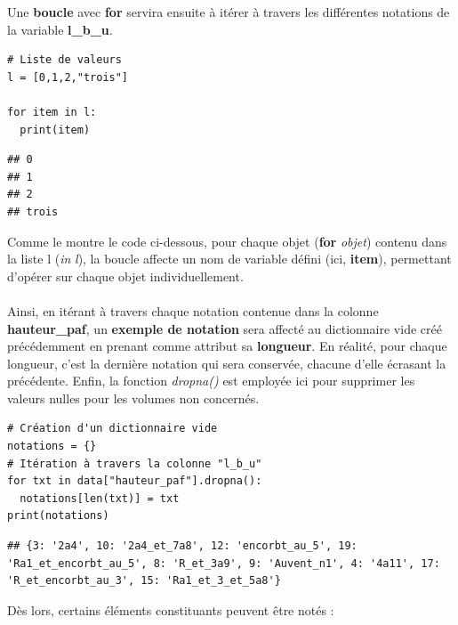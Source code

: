 \documentclass[
  11pt,
  french,
]{article}
\begin{document}
Une \textbf{boucle} avec \textbf{for} servira ensuite à itérer à travers
les différentes notations de la variable \textbf{l\_b\_u}.

\begin{tcolorbox}[title= Exemple de boucle en for ,colback=boitecode]
\begin{lstlisting}[style=code]
# Liste de valeurs
l = [0,1,2,"trois"]

for item in l:
  print(item)\end{lstlisting}
\begin{lstlisting}[style=out]
## 0
## 1
## 2
## trois
\end{lstlisting}
\end{tcolorbox}

Comme le montre le code ci-dessous, pour chaque objet (\textbf{for}
\emph{objet}) contenu dans la liste l (\emph{in} \emph{l}), la boucle
affecte un nom de variable défini (ici, \textbf{item}), permettant
d'opérer sur chaque objet individuellement.\\
~\\

Ainsi, en itérant à travers chaque notation contenue dans la colonne
\textbf{hauteur\_paf}, un \textbf{exemple de notation} sera affecté au
dictionnaire vide créé précédemment en prenant comme attribut sa
\textbf{longueur}. En réalité, pour chaque longueur, c'est la dernière
notation qui sera conservée, chacune d'elle écrasant la précédente.
Enfin, la fonction \emph{dropna()} est employée ici pour supprimer les
valeurs nulles pour les volumes non concernés.

\begin{tcolorbox}[title= Énumération des différentes notations ,colback=boitecode]
\begin{lstlisting}[style=code]
# Création d'un dictionnaire vide
notations = {}
# Itération à travers la colonne "l_b_u"
for txt in data["hauteur_paf"].dropna():
  notations[len(txt)] = txt
print(notations)\end{lstlisting}
\begin{lstlisting}[style=out]
## {3: '2a4', 10: '2a4_et_7a8', 12: 'encorbt_au_5', 19: 'Ra1_et_encorbt_au_5', 8: 'R_et_3a9', 9: 'Auvent_n1', 4: '4a11', 17: 'R_et_encorbt_au_3', 15: 'Ra1_et_3_et_5a8'}
\end{lstlisting}
\end{tcolorbox}

Dès lors, certains éléments constituants peuvent être notés :
\end{document}
